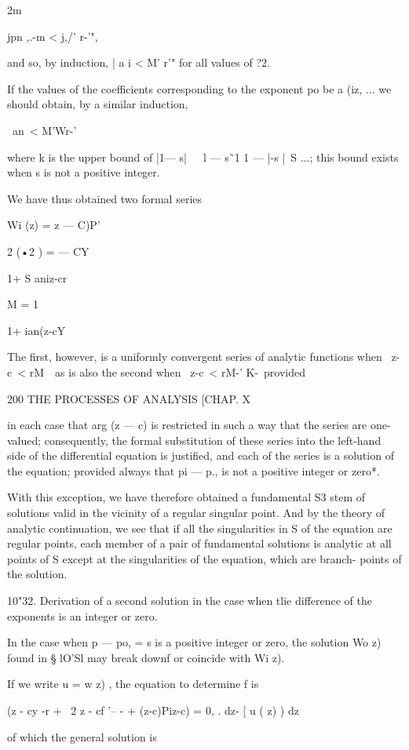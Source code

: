 2m

jpn ,.-m < j,/' r-'",

and so, by induction, | a i < M' r'" for all values of ?2.

If the values of the coefficients corresponding to the exponent po be
a (iz, ... we should obtain, by a similar induction,

\ an\ < M'Wr-'\

where k is the upper bound of |1— s|~\ \ l — s\~\ 1 1 — |-s |~S ...;
this bound exists when s is not a positive integer.

We have thus obtained two formal series

Wi (z) = z — C)P'

 2 (•2 ) = — CY

1+ S aniz-cr

M = 1

1+ ian(z-cY

The first, however, is a uniformly convergent series of analytic
functions when \ z-c\ < rM~\ as is also the second when \ z-c\ < rM-'
K-\ provided

200 THE PROCESSES OF ANALYSIS [CHAP. X

in each case that arg (z — c) is restricted in such a way that the
series are one-valued; consequently, the formal substitution of these
series into the left-hand side of the differential equation is
justified, and each of the series is a solution of the equation;
provided always that pi — p., is not a positive integer or zero*.

With this exception, we have therefore obtained a fundamental S3 stem
of solutions valid in the vicinity of a regular singular point. And by
the theory of analytic continuation, we see that if all the
singularities in S of the equation are regular points, each member of
a pair of fundamental solutions is analytic at all points of S except
at the singularities of the equation, which are branch- points of the
solution.

10"32. Derivation of a second solution in the case when tlie
difference of the exponents is an integer or zero.

In the case when p — po, = s is a positive integer or zero, the
solution Wo z) found in § lO'Sl may break downf or coincide with Wi
z).

If we write u = w z) , the equation to determine f is

(z - cy -r + \ 2 z - cf '-- - + (z-c)Piz-c) = 0, . dz- [ u ( z) ) dz

of which the general solution is

